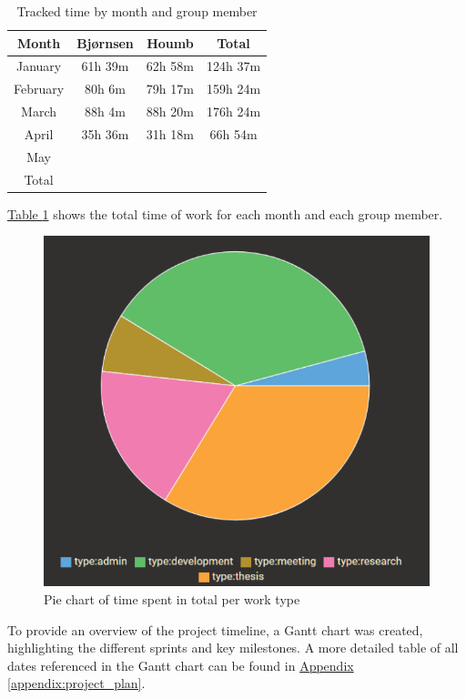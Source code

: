 \begin{table}[h]
    \centering
    \begin{tabular}{c|c|c|c}
        \hline
        \textbf{Month} & \textbf{Bjørnsen} & \textbf{Houmb} & \textbf{Total} \\
        \hline
        January  & 61h 39m  & 62h 58m  & 124h 37m \\
        February & 80h 6m   & 79h 17m  & 159h 24m \\
        March    & 88h 4m   & 88h 20m  & 176h 24m \\
        April    & 35h 36m  & 31h 18m  & 66h 54m \\
        May      &        &        &        \\
        \hline
        Total & & & \\
        \hline
    \end{tabular}
    \caption{Tracked time by month and group member}
    \label{tab:tracked_time_by_month_member}
\end{table}

\hyperref[tab:tracked_time_by_month_member]{Table \ref*{tab:tracked_time_by_month_member}} shows the total time of work for each month and each group member.

\begin{figure}[h]
    \centering
    \includegraphics[width=0.5\linewidth]{figures/time_tracking_by_type.pdf}
    \caption{Pie chart of time spent in total per work type}
    \label{fig:time_tracking_by_type}
\end{figure}


To provide an overview of the project timeline, a Gantt chart was created, highlighting the different sprints and key milestones. A more detailed table of all dates referenced in the Gantt chart can be found in \hyperref[appendix:project_plan]{Appendix \ref*{appendix:project_plan}}.

